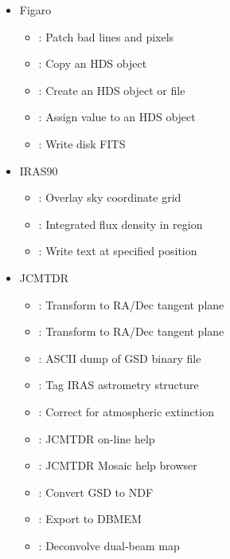 \documentclass[11pt,noabs]{starlink}
\begin{document}
\begin{itemize}
\item Figaro 
   \begin{itemize}
   \item {}: Patch bad lines and pixels
   \item {}: Copy an HDS object
   \item {}: Create an HDS object or file
   \item {}: Assign value to an HDS object
   \item {}: Write disk FITS
   \end{itemize}
\item IRAS90 
   \begin{itemize}
   \item {}: Overlay sky coordinate grid
   \item {}: Integrated flux density in region
   \item {}: Write text at specified position
   \end{itemize}
\item JCMTDR 
   \begin{itemize}
   \item {}: Transform to RA/Dec tangent plane
   \item {}: Transform to RA/Dec tangent plane
   \item {}: ASCII dump of GSD binary file
   \item {}: Tag IRAS astrometry structure
   \item {}: Correct for atmospheric extinction
   \item {}: JCMTDR on-line help
   \item {}: JCMTDR Mosaic help browser
   \item {}: Convert GSD to NDF
   \item {}: Export to DBMEM
   \item {}: Deconvolve dual-beam map
   \end{itemize}

\end{itemize}
\end{document}

